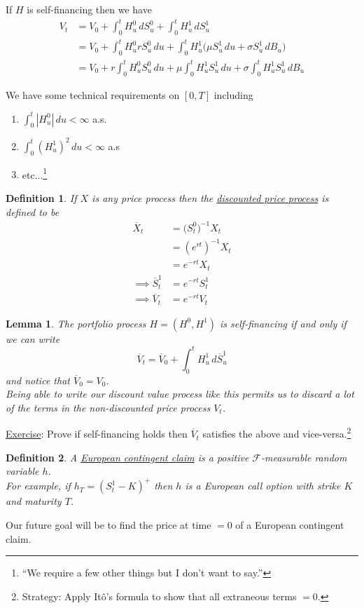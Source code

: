 \documentclass[12pt]{article}
\newtheorem{definition}{Definition}
\newtheorem{lemma}{Lemma}
\newlength\tindent
\renewcommand{\indent}{\hspace*{\tindent}}
\begin{document}
If $H$ is self-financing then we have
\begin{align*}
	V_t &= V_0 + \int^t_0 H^0_u\,dS^0_u + \int^t_0 H^1_u\,dS^1_u \\
	&= V_0 + \int^t_0 H^0_urS^0_u\,du + \int^t_0 H^1_u\big(\mu S^1_u\,du + \sigma S^1_u\,dB_u\big) \\
	&= V_0 + r\int^t_0 H^0_uS^0_u\,du + \mu\int^t_0 H^1_uS^1_u\,du + \sigma\int^t_0 H^1_uS^1_u\,dB_u
\end{align*}

We have some technical requirements on $[0,T]$ including
\begin{enumerate}
	\item $\int^t_0 |H^0_u|\,du < \infty$ a.s.
	\item $\int^t_0 (H^1_u)^2\,du < \infty$ a.s
	\item etc...\footnote{``We require a few other things but I don't want to say.''}
\end{enumerate}

\begin{definition} If $X$ is any price process then the \underline{discounted price process} is defined to be
\begin{align*}
	\overline{X}_t &= \big(S^0_t\big)^{-1}X_t \\
	&= (e^{rt})^{-1}X_t \\
	&= e^{-rt}X_t \\
	\implies \overline{S}^1_t &= e^{-rt}S^1_t \\
	\implies \overline{V}_t &= e^{-rt}V_t
\end{align*}
\end{definition}

\begin{lemma} The portfolio process $H = (H^0,H^1)$ is self-financing if and only if we can write
\begin{equation*}
	\overline{V}_t = \overline{V}_0 + \int^t_0 H^1_u\,d\overline{S}^1_u
\end{equation*}
and notice that $\overline{V}_0 = V_0$. \\

\indent Being able to write our discount value process like this permits us to discard a lot of the terms in the non-discounted price process $V_t$.
\end{lemma}

\underline{Exercise}: Prove if self-financing holds then $\overline{V}_t$ satisfies the above and vice-versa.\footnote{Strategy: Apply It\^{o}'s formula to show that all extraneous terms $ = 0$.}


\begin{definition} A \underline{European contingent claim} is a positive $\mathcal F$-measurable random variable $h$. \\

\indent For example, if $h_T = (S^1_t - K)^+$ then $h$ is a European call option with strike $K$ and maturity $T$.
\end{definition}

Our future goal will be to find the price at time $= 0$ of a European contingent claim.
\end{document}
